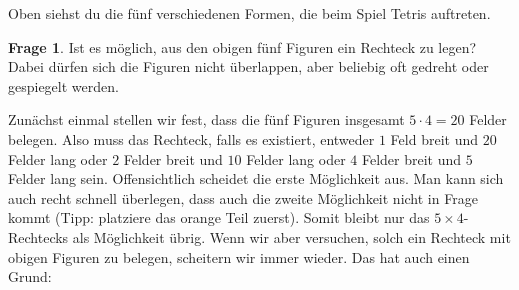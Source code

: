 \documentclass[a4paper,ngerman,12pt]{scrartcl}
\theoremstyle{definition}
\newtheorem*{frage}{Frage}
\begin{document}
Oben siehst du die fünf verschiedenen Formen, die beim Spiel Tetris auftreten.

\begin{frage}
  Ist es möglich, aus den obigen fünf Figuren ein Rechteck zu legen? Dabei dürfen sich die Figuren nicht überlappen, aber beliebig oft gedreht oder gespiegelt werden.
\end{frage}

Zunächst einmal stellen wir fest, dass die fünf Figuren insgesamt $5 \cdot 4 = 20$ Felder belegen. Also muss das Rechteck, falls es existiert, entweder $1$ Feld breit und $20$ Felder lang oder $2$ Felder breit und $10$ Felder lang oder $4$ Felder breit und $5$ Felder lang sein. Offensichtlich scheidet die erste Möglichkeit aus. Man kann sich auch recht schnell überlegen, dass auch die zweite Möglichkeit nicht in Frage kommt (Tipp: platziere das orange Teil zuerst). Somit bleibt nur das $5 \times 4$-Rechtecks als Möglichkeit übrig. Wenn wir aber versuchen, solch ein Rechteck mit obigen Figuren zu belegen, scheitern wir immer wieder. Das hat auch einen Grund:
\end{document}
